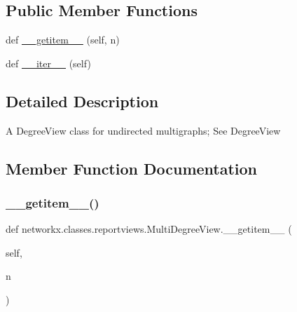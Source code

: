 \subsection*{Public Member Functions}
\begin{DoxyCompactItemize}
\item 
def \hyperlink{classnetworkx_1_1classes_1_1reportviews_1_1MultiDegreeView_aceca14e12e802e5a8fa4efc86ea3c0ad}{\+\_\+\+\_\+getitem\+\_\+\+\_\+} (self, n)
\item 
def \hyperlink{classnetworkx_1_1classes_1_1reportviews_1_1MultiDegreeView_ae4c1187c6cc944ebef30b54716121565}{\+\_\+\+\_\+iter\+\_\+\+\_\+} (self)
\end{DoxyCompactItemize}


\subsection{Detailed Description}
\begin{DoxyVerb}A DegreeView class for undirected multigraphs; See DegreeView\end{DoxyVerb}
 

\subsection{Member Function Documentation}
\mbox{\label{classnetworkx_1_1classes_1_1reportviews_1_1MultiDegreeView_aceca14e12e802e5a8fa4efc86ea3c0ad}} 
\subsubsection{\texorpdfstring{\+\_\+\+\_\+getitem\+\_\+\+\_\+()}{\_\_getitem\_\_()}}
{\footnotesize\ttfamily def networkx.\+classes.\+reportviews.\+Multi\+Degree\+View.\+\_\+\+\_\+getitem\+\_\+\+\_\+ (\begin{DoxyParamCaption}\item[{}]{self,  }\item[{}]{n }\end{DoxyParamCaption})}

